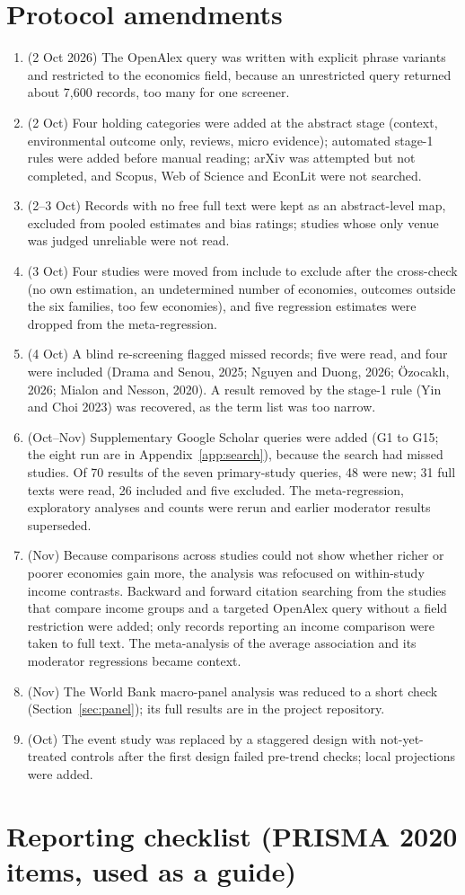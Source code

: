 \documentclass[11pt,a4paper]{article}
\begin{document}
\section{Protocol amendments}\label{app:amend}
\small
\begin{enumerate}[leftmargin=1.6em,itemsep=2pt]
\item (2 Oct 2026) The OpenAlex query was written with explicit phrase variants and restricted to the economics field, because an unrestricted query returned about 7,600 records, too many for one screener.
\item (2 Oct) Four holding categories were added at the abstract stage (context, environmental outcome only, reviews, micro evidence); automated stage-1 rules were added before manual reading; arXiv was attempted but not completed, and Scopus, Web of Science and EconLit were not searched.
\item (2--3 Oct) Records with no free full text were kept as an abstract-level map, excluded from pooled estimates and bias ratings; studies whose only venue was judged unreliable were not read.
\item (3 Oct) Four studies were moved from include to exclude after the cross-check (no own estimation, an undetermined number of economies, outcomes outside the six families, too few economies), and five regression estimates were dropped from the meta-regression.
\item (4 Oct) A blind re-screening flagged missed records; five were read, and four were included (Drama and Senou, 2025; Nguyen and Duong, 2026; \"{O}zocakl{\i}, 2026; Mialon and Nesson, 2020). A result removed by the stage-1 rule (Yin and Choi 2023) was recovered, as the term list was too narrow.
\item (Oct--Nov) Supplementary Google Scholar queries were added (G1 to G15; the eight run are in Appendix~\ref{app:search}), because the search had missed studies. Of 70 results of the seven primary-study queries, 48 were new; 31 full texts were read, 26 included and five excluded. The meta-regression, exploratory analyses and counts were rerun and earlier moderator results superseded.
\item (Nov) Because comparisons across studies could not show whether richer or poorer economies gain more, the analysis was refocused on within-study income contrasts. Backward and forward citation searching from the studies that compare income groups and a targeted OpenAlex query without a field restriction were added; only records reporting an income comparison were taken to full text. The meta-analysis of the average association and its moderator regressions became context.
\item (Nov) The World Bank macro-panel analysis was reduced to a short check (Section~\ref{sec:panel}); its full results are in the project repository.
\item (Oct) The event study was replaced by a staggered design with not-yet-treated controls after the first design failed pre-trend checks; local projections were added.
\end{enumerate}

\section{Reporting checklist (PRISMA 2020 items, used as a guide)}\label{app:prisma}

\end{document}

